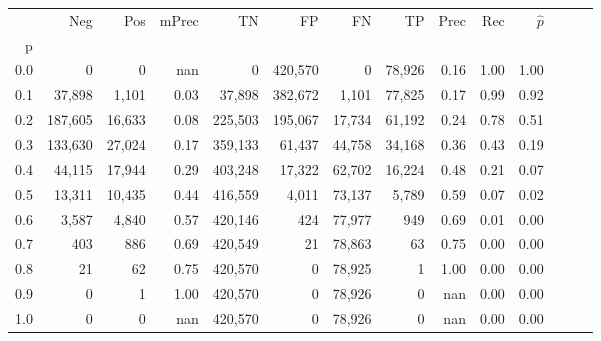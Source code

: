 \begin{tabular}{rrrrrrrrrrrrrr}
\toprule
{} &      Neg &     Pos & mPrec &       TN &       FP &      FN &      TP &  Prec &   Rec & $\hat{p}$ \\
p   &          &         &       &          &          &         &         &       &       &           \\
\midrule
0.0 &        0 &       0 &   nan &        0 &  420,570 &       0 &  78,926 &  0.16 &  1.00 &      1.00 \\
0.1 &   37,898 &   1,101 &  0.03 &   37,898 &  382,672 &   1,101 &  77,825 &  0.17 &  0.99 &      0.92 \\
0.2 &  187,605 &  16,633 &  0.08 &  225,503 &  195,067 &  17,734 &  61,192 &  0.24 &  0.78 &      0.51 \\
0.3 &  133,630 &  27,024 &  0.17 &  359,133 &   61,437 &  44,758 &  34,168 &  0.36 &  0.43 &      0.19 \\
0.4 &   44,115 &  17,944 &  0.29 &  403,248 &   17,322 &  62,702 &  16,224 &  0.48 &  0.21 &      0.07 \\
0.5 &   13,311 &  10,435 &  0.44 &  416,559 &    4,011 &  73,137 &   5,789 &  0.59 &  0.07 &      0.02 \\
0.6 &    3,587 &   4,840 &  0.57 &  420,146 &      424 &  77,977 &     949 &  0.69 &  0.01 &      0.00 \\
0.7 &      403 &     886 &  0.69 &  420,549 &       21 &  78,863 &      63 &  0.75 &  0.00 &      0.00 \\
0.8 &       21 &      62 &  0.75 &  420,570 &        0 &  78,925 &       1 &  1.00 &  0.00 &      0.00 \\
0.9 &        0 &       1 &  1.00 &  420,570 &        0 &  78,926 &       0 &   nan &  0.00 &      0.00 \\
1.0 &        0 &       0 &   nan &  420,570 &        0 &  78,926 &       0 &   nan &  0.00 &      0.00 \\
\bottomrule
\end{tabular}
